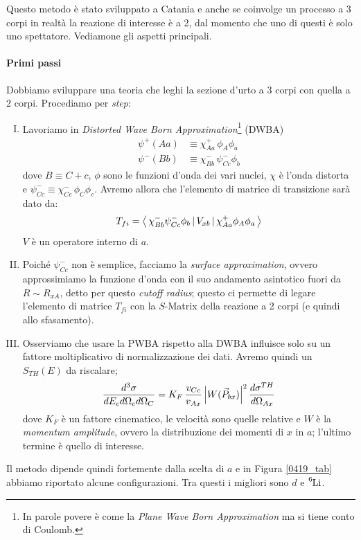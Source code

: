 \noindent Questo metodo è stato sviluppato a Catania e anche se coinvolge un processo a 3 corpi in realtà la reazione di interesse è a 2, dal momento che uno di questi è solo uno spettatore. Vediamone gli aspetti principali.

\paragraph{Primi passi} 
Dobbiamo sviluppare una teoria che leghi la sezione d'urto a 3 corpi con quella a 2 corpi. Procediamo per \textit{step}:
\begin{enumerate}[I.]
	\item Lavoriamo in \textit{Distorted Wave Born Approximation}\footnote{In parole povere è come la \textit{Plane Wave Born Approximation} ma si tiene conto di Coulomb.} (DWBA)
	\begin{align*}
		\psi^+(Aa) &\equiv \chi_{Aa}^+\, \phi_A \phi_a \\
		\psi^-(Bb) &\equiv \chi_{Bb}^-\, \psi_{Cc}^- \phi_b
	\end{align*}
	dove $B\equiv C+c$, $\phi$ sono le funzioni d'onda dei vari nuclei, $\chi$ è l'onda distorta e $\psi_{Cc}^- \equiv \chi_{Cc}^-\, \phi_C \phi_c$. Avremo allora che l'elemento di matrice di transizione sarà dato da:
	$$T_{fi} = \bigl\langle\, \chi_{Bb}^- \psi_{Cc}^- \phi_b\, |\,V_{xb}\, |\,\chi_{Aa}^+\phi_A\phi_a\, \bigr\rangle$$
	$V$ è un operatore interno di $a$.
	\item Poiché $\psi_{Cc}^-$ non è semplice, facciamo la \textit{surface approximation}, ovvero approssimiamo la funzione d'onda con il suo andamento asintotico fuori da $R\sim R_{xA}$, detto per questo \textit{cutoff radius}; questo ci permette di legare l'elemento di matrice $T_{fi}$ con la $S$-Matrix della reazione a 2 corpi (e quindi allo sfasamento).
	\item Osserviamo che usare la PWBA rispetto alla DWBA influisce solo su un fattore moltiplicativo di normalizzazione dei dati. Avremo quindi un $S_{TH}(E)$ da riscalare;
	$$\frac{d^3\sigma}{dE_c d\Omega_cd\Omega_{C}} = {K_F}\, \frac{v_{Cc}}{v_{Ax}}\, \Bigl | W(\vec{P}_{bx}) \Bigr |^2\, \frac{d\sigma^{TH}}{d\Omega_{Ax}}$$ %
	dove $K_F$ è un fattore cinematico, le velocità sono quelle relative e $W$ è la \textit{momentum amplitude}, ovvero la distribuzione dei momenti di $x$ in $a$; l'ultimo termine è quello di interesse.
\end{enumerate}
\noindent Il metodo dipende quindi fortemente dalla scelta di $a$ e in Figura \ref{0419_tab} abbiamo riportato alcune configurazioni. Tra questi i migliori sono $d$ e $\ce{^6Li}$.

